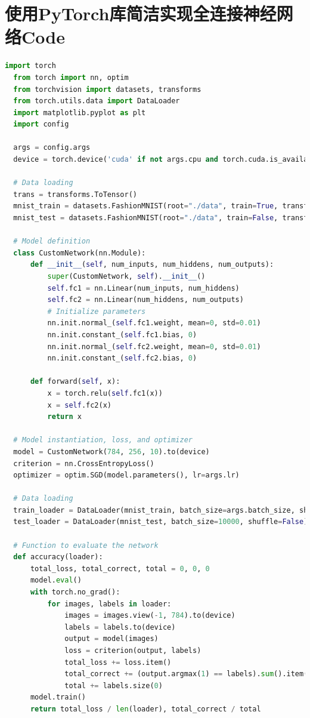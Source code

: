 \documentclass[12pt]{article}
\begin{document}
\section{使用PyTorch库简洁实现全连接神经网络Code}
\begin{lstlisting}[language=Python]
  import torch
  from torch import nn, optim
  from torchvision import datasets, transforms
  from torch.utils.data import DataLoader
  import matplotlib.pyplot as plt
  import config
  
  args = config.args
  device = torch.device('cuda' if not args.cpu and torch.cuda.is_available() else 'cpu')
  
  # Data loading
  trans = transforms.ToTensor()
  mnist_train = datasets.FashionMNIST(root="./data", train=True, transform=trans, download=True)
  mnist_test = datasets.FashionMNIST(root="./data", train=False, transform=trans, download=True)
  
  # Model definition
  class CustomNetwork(nn.Module):
      def __init__(self, num_inputs, num_hiddens, num_outputs):
          super(CustomNetwork, self).__init__()
          self.fc1 = nn.Linear(num_inputs, num_hiddens)
          self.fc2 = nn.Linear(num_hiddens, num_outputs)
          # Initialize parameters
          nn.init.normal_(self.fc1.weight, mean=0, std=0.01)
          nn.init.constant_(self.fc1.bias, 0)
          nn.init.normal_(self.fc2.weight, mean=0, std=0.01)
          nn.init.constant_(self.fc2.bias, 0)
  
      def forward(self, x):
          x = torch.relu(self.fc1(x))
          x = self.fc2(x)
          return x
  
  # Model instantiation, loss, and optimizer
  model = CustomNetwork(784, 256, 10).to(device)
  criterion = nn.CrossEntropyLoss()
  optimizer = optim.SGD(model.parameters(), lr=args.lr)
  
  # Data loading
  train_loader = DataLoader(mnist_train, batch_size=args.batch_size, shuffle=True)
  test_loader = DataLoader(mnist_test, batch_size=10000, shuffle=False)
  
  # Function to evaluate the network
  def accuracy(loader):
      total_loss, total_correct, total = 0, 0, 0
      model.eval()
      with torch.no_grad():
          for images, labels in loader:
              images = images.view(-1, 784).to(device)
              labels = labels.to(device)
              output = model(images)
              loss = criterion(output, labels)
              total_loss += loss.item()
              total_correct += (output.argmax(1) == labels).sum().item()
              total += labels.size(0)
      model.train()
      return total_loss / len(loader), total_correct / total
  

\end{lstlisting}
\end{document}
